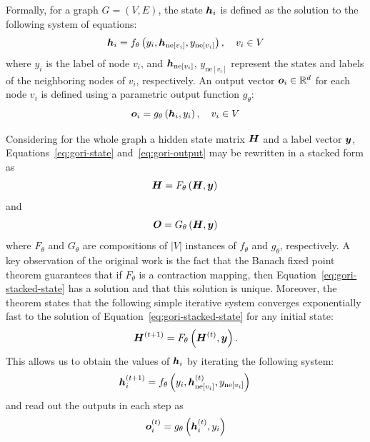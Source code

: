 Formally, for a graph \( G = (V, E) \), the state \( \bm{h}_i \) is defined as the solution to the following system of equations:
\begin{equation}\label{eq:gori-state}
	\bm{h}_i = f_\theta \left( y_i, \bm{h}_{\mathrm{ne}[v_i]}, y_{\mathrm{ne}[v_i]} \right) , \quad v_i \in V
\end{equation}
where \( y_i \) is the label of node \( v_i \), and \( \bm{h}_{\mathrm{ne}[v_i]} \), \( y_{\mathrm{ne}[v_i]} \) represent the states and labels of the neighboring nodes of \( v_i \), respectively. An output vector \( \bm{o}_i \in \mathbb{R}^d \) for each node \( v_i \) is defined using a parametric output function \( g_\theta \):
\begin{equation}\label{eq:gori-output}
	\bm{o}_i = g_\theta \left( \bm{h}_i, y_i \right) , \quad v_i \in V
\end{equation}

Considering for the whole graph a hidden state matrix \( \bm{H} \) and a label vector \( \bm{y} \), Equations~\ref{eq:gori-state} and~\ref{eq:gori-output} may be rewritten in a stacked form as
\begin{equation}\label{eq:gori-stacked-state}
	\bm{H} = F_\theta \left( \bm{H}, \bm{y} \right) \\
\end{equation}
and
\begin{equation}\label{eq:gori-stacked-output}
	\bm{O} = G_\theta \left( \bm{H}, \bm{y} \right)
\end{equation}
where \( F_\theta \) and \( G_\theta \) are compositions of \( \left\lvert V \right\rvert \) instances of \( f_\theta \) and \( g_\theta \), respectively. A key observation of the original work is the fact that the Banach fixed point theorem guarantees that if \( F_\theta \) is a contraction mapping, then Equation~\ref{eq:gori-stacked-state} has a solution and that this solution is unique. Moreover, the theorem states that the following simple iterative system converges exponentially fast to the solution of Equation~\ref{eq:gori-stacked-state} for any initial state:
\begin{equation}
	\bm{H}^{(t+1)} = F_\theta \left( \bm{H}^{(t)}, \bm{y} \right).
\end{equation}
This allows us to obtain the values of \( \bm{h}_i \) by iterating the following system:
\begin{equation}\label{eq:gori-iterative}
	\bm{h}_i^{(t+1)} = f_\theta \left( y_i, \bm{h}_{\mathrm{ne}[v_i]}^{(t)}, y_{\mathrm{ne}[v_i]} \right) \\
\end{equation}
and read out the outputs in each step as
\begin{equation}
	\bm{o}_i^{(t)} = g_\theta \left( \bm{h}_i^{(t)}, y_i \right)
\end{equation}

